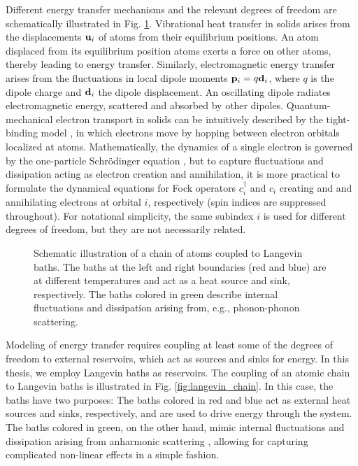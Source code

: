 Different energy transfer mechanisms and the relevant degrees of freedom are schematically illustrated in Fig. \ref{fig:mechanisms}. Vibrational heat transfer in solids arises from the displacements $\mathbf{u}_i$ of atoms from their equilibrium positions. An atom displaced from its equilibrium position atoms exerts a force on other atoms, thereby leading to energy transfer. Similarly, electromagnetic energy transfer arises from the fluctuations in local dipole moments $\mathbf{p}_i=q\mathbf{d}_i$, where $q$ is the dipole charge and $\mathbf{d}_i$ the dipole displacement. An oscillating dipole radiates electromagnetic energy, scattered and absorbed by other dipoles. Quantum-mechanical electron transport in solids can be intuitively described by the tight-binding model \cite{}, in which electrons move by hopping between electron orbitals localized at atoms. Mathematically, the dynamics of a single electron is governed by the one-particle Schr\"odinger equation \cite{griffiths_qm}, but to capture fluctuations and dissipation acting as electron creation and annihilation, it is more practical to formulate the dynamical equations for Fock operators $c_i^{\dagger}$ and $c_i$ \cite{ballentine} creating and and annihilating electrons at orbital $i$, respectively (spin indices are suppressed throughout). For notational simplicity, the same subindex $i$ is used for different degrees of freedom, but they are not necessarily related. 

\begin{figure}
 \begin{center}
 \end{center}
 \caption{Schematic illustration of a chain of atoms coupled to Langevin baths. The baths at the left and right boundaries (red and blue) are at different temperatures and act as a heat source and sink, respectively. The baths colored in green describe internal fluctuations and dissipation arising from, e.g., phonon-phonon scattering.}
 \label{fig:mechanisms}
\end{figure}

Modeling of energy transfer requires coupling at least some of the degrees of freedom to external reservoirs, which act as sources and sinks for energy. In this thesis, we employ Langevin baths as reservoirs. The coupling of an atomic chain to Langevin baths is illustrated in Fig. \ref{fig:langevin_chain}. In this case, the baths have two purposes: The baths colored in red and blue act as external heat sources and sinks, respectively, and are used to drive energy through the system. The baths colored in green, on the other hand, mimic internal fluctuations and dissipation arising from anharmonic scattering \cite{bolsterli70}, allowing for capturing complicated non-linear effects in a simple fashion. 


